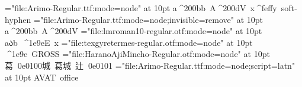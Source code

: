 \font\ar="file:Arimo-Regular.ttf:mode=node" at 10pt
\hbox{\ar a^^^^200bb A^^^^200dV x^^^^feffy soft^^adhyphen}
\font\arrm="file:Arimo-Regular.ttf:mode=node;invisible=remove" at 10pt
\hbox{\arrm a^^^^200bb A^^^^200dV}
\font\lm="file:lmroman10-regular.otf:mode=node" at 10pt
\hbox{\lm aაb ^^^^1e9eE x}
\font\tm="file:texgyretermes-regular.otf:mode=node" at 10pt
\hbox{\tm ^^^^1e9e GROSS}
\font\ha="file:HaranoAjiMincho-Regular.otf:mode=node" at 10pt
\hbox{\ha 葛^^^^^^0e0100城 葛城 辻^^^^^^0e0101}
\font\arl="file:Arimo-Regular.ttf:mode=node;script=latn" at 10pt
\hbox{\arl AVAT office}

